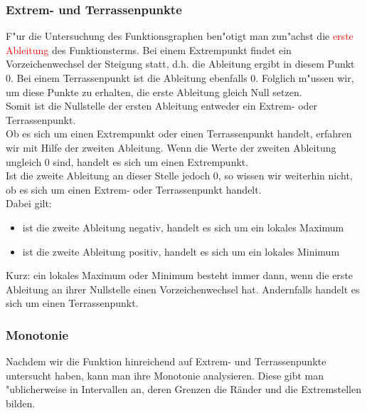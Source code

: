  \subsubsection{Extrem- und Terrassenpunkte}
  F"ur die Untersuchung des Funktionsgraphen ben"otigt man zun"achst die \textcolor{red}{erste Ableitung} des Funktionsterms. Bei einem Extrempunkt findet ein Vorzeichenwechsel der Steigung statt, d.h. die Ableitung ergibt in diesem Punkt 0. Bei einem Terrassenpunkt ist die Ableitung ebenfalls 0. Folglich m"ussen wir, um diese Punkte zu erhalten, die erste Ableitung gleich Null setzen.\\
  Somit ist die Nullstelle der ersten Ableitung entweder ein Extrem- oder Terrassenpunkt.\\
  Ob es sich um einen Extrempunkt oder einen Terrassenpunkt handelt, erfahren wir mit Hilfe der zweiten Ableitung.
  Wenn die Werte der zweiten Ableitung ungleich 0 sind, handelt es sich um einen Extrempunkt.\\
  Ist die zweite Ableitung an dieser Stelle jedoch 0, so wissen wir weiterhin nicht, ob es sich um einen Extrem- oder Terrassenpunkt handelt.\\
  Dabei gilt: 
  \begin{itemize}
  \item ist die zweite Ableitung negativ, handelt es sich um ein lokales Maximum
  \item ist die zweite Ableitung positiv, handelt es sich um ein lokales Minimum
  \end{itemize}
  Kurz: ein lokales Maximum oder Minimum besteht immer dann, wenn die erste Ableitung an ihrer Nullstelle einen Vorzeichenwechsel hat. Andernfalls handelt es sich um einen Terrassenpunkt.
 \subsubsection{Monotonie}
  Nachdem wir die Funktion hinreichend auf Extrem- und Terrassenpunkte untersucht haben, kann man ihre Monotonie analysieren. Diese gibt man "ublicherweise in Intervallen an, deren Grenzen die Ränder und die Extremstellen bilden.

